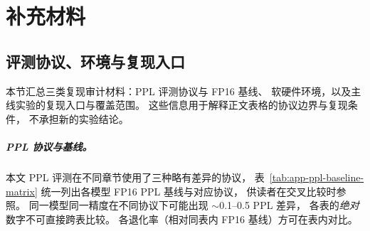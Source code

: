 
\chapter{补充材料}

\section{评测协议、环境与复现入口}
\label{sec:app-fp16-protocol}
\label{sec:app-ppl-baseline-matrix}

本节汇总三类复现审计材料：PPL 评测协议与 FP16 基线、
软硬件环境，以及主线实验的复现入口与覆盖范围。
这些信息用于解释正文表格的协议边界与复现条件，
不承担新的实验结论。

\paragraph{PPL 协议与基线。}
本文 PPL 评测在不同章节使用了三种略有差异的协议，
表~\ref{tab:app-ppl-baseline-matrix} 统一列出各模型 FP16 PPL 基线与对应协议，
供读者在交叉比较时参照。
同一模型同一精度在不同协议下可能出现 $\sim$0.1--0.5 PPL 差异，
各表的\emph{绝对}数字不可直接跨表比较。
各退化率（相对同表内 FP16 基线）方可在表内对比。


